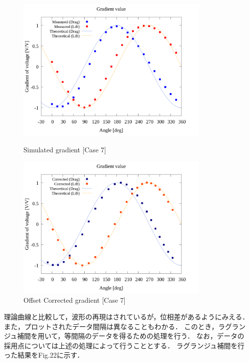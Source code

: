 \begin{figure}[htbp]
  \begin{center}
    \includegraphics[width=95mm]{../../02_workspace/result/simulation_tx=10.0_ty=-5.0_dx=5.00_dy=-2.50/plot/20/20_adjust-value.png}
    \caption{Simulated gradient [Case 7]}
    \includegraphics[width=95mm]{../../02_workspace/result/simulation_tx=10.0_ty=-5.0_dx=5.00_dy=-2.50/plot/21/21-2_summary_offset.png}
    \caption{Offset Corrected gradient [Case 7]}
  \end{center}
\end{figure}

\newpage

理論曲線と比較して，波形の再現はされているが，位相差があるようにみえる．
また，プロットされたデータ間隔は異なることもわかる．
このとき，ラグランジュ補間を用いて，等間隔のデータを得るための処理を行う．
なお，データの採用点については上述の処理によって行うこととする．
ラグランジュ補間を行った結果をFig.22に示す．

